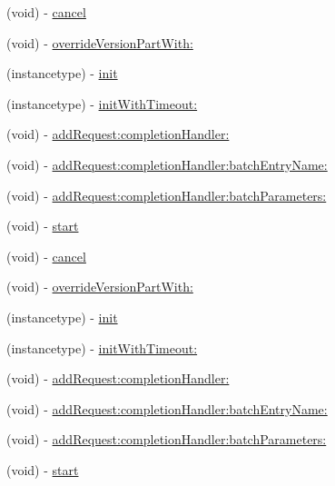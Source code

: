 \begin{DoxyCompactItemize}
(void) -\/ \hyperlink{interfaceFBRequestConnection_aacedf34994dad63d0b6272cfec921889}{cancel}
\item 
(void) -\/ \hyperlink{interfaceFBRequestConnection_a225e5854a3413c22bff120114889ad07}{override\+Version\+Part\+With\+:}
\item 
(instancetype) -\/ \hyperlink{interfaceFBRequestConnection_aaa4ab7062e1647fa4d29964052372363}{init}
\item 
(instancetype) -\/ \hyperlink{interfaceFBRequestConnection_a00435ea153b22e8613108afdbabcadff}{init\+With\+Timeout\+:}
\item 
(void) -\/ \hyperlink{interfaceFBRequestConnection_a751b0603d2cc22be745f33a112681e0d}{add\+Request\+:completion\+Handler\+:}
\item 
(void) -\/ \hyperlink{interfaceFBRequestConnection_a9df3d0f146f9c8caada8ed8402dd7528}{add\+Request\+:completion\+Handler\+:batch\+Entry\+Name\+:}
\item 
(void) -\/ \hyperlink{interfaceFBRequestConnection_abbfd3d7c45f3c3a33a20e093436939e3}{add\+Request\+:completion\+Handler\+:batch\+Parameters\+:}
\item 
(void) -\/ \hyperlink{interfaceFBRequestConnection_a8ddb3ae0c9915b148492678fdbc66a6c}{start}
\item 
(void) -\/ \hyperlink{interfaceFBRequestConnection_aacedf34994dad63d0b6272cfec921889}{cancel}
\item 
(void) -\/ \hyperlink{interfaceFBRequestConnection_a225e5854a3413c22bff120114889ad07}{override\+Version\+Part\+With\+:}
\item 
(instancetype) -\/ \hyperlink{interfaceFBRequestConnection_aaa4ab7062e1647fa4d29964052372363}{init}
\item 
(instancetype) -\/ \hyperlink{interfaceFBRequestConnection_a00435ea153b22e8613108afdbabcadff}{init\+With\+Timeout\+:}
\item 
(void) -\/ \hyperlink{interfaceFBRequestConnection_a751b0603d2cc22be745f33a112681e0d}{add\+Request\+:completion\+Handler\+:}
\item 
(void) -\/ \hyperlink{interfaceFBRequestConnection_a9df3d0f146f9c8caada8ed8402dd7528}{add\+Request\+:completion\+Handler\+:batch\+Entry\+Name\+:}
\item 
(void) -\/ \hyperlink{interfaceFBRequestConnection_abbfd3d7c45f3c3a33a20e093436939e3}{add\+Request\+:completion\+Handler\+:batch\+Parameters\+:}
\item 
(void) -\/ \hyperlink{interfaceFBRequestConnection_a8ddb3ae0c9915b148492678fdbc66a6c}{start}
\item 

\end{DoxyCompactItemize}
